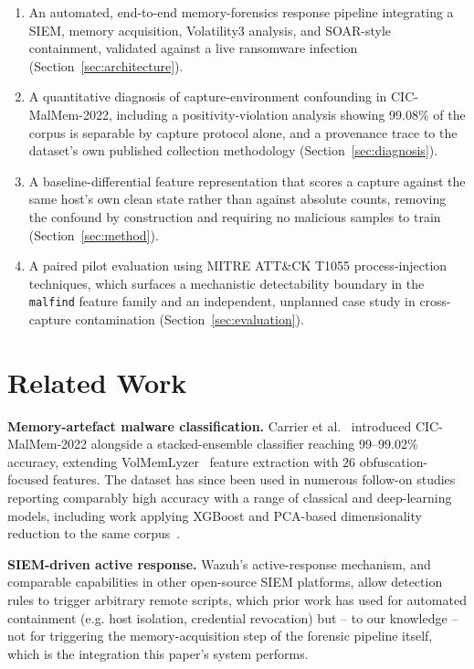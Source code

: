 \documentclass[conference]{IEEEtran}
\begin{document}
\begin{enumerate}
\item An automated, end-to-end memory-forensics response pipeline integrating a
SIEM, memory acquisition, Volatility3 analysis, and SOAR-style containment,
validated against a live ransomware infection (Section~\ref{sec:architecture}).
\item A quantitative diagnosis of capture-environment confounding in
CIC-MalMem-2022, including a positivity-violation analysis showing 99.08\% of
the corpus is separable by capture protocol alone, and a provenance trace to the
dataset's own published collection methodology (Section~\ref{sec:diagnosis}).
\item A baseline-differential feature representation that scores a capture
against the same host's own clean state rather than against absolute counts,
removing the confound by construction and requiring no malicious samples to
train (Section~\ref{sec:method}).
\item A paired pilot evaluation using MITRE ATT\&CK T1055 process-injection
techniques, which surfaces a mechanistic detectability boundary in the
\texttt{malfind} feature family and an independent, unplanned case study in
cross-capture contamination (Section~\ref{sec:evaluation}).
\end{enumerate}

\section{Related Work}

\textbf{Memory-artefact malware classification.} Carrier et al.~\cite{carrier2022}
introduced CIC-MalMem-2022 alongside a stacked-ensemble classifier reaching
99--99.02\% accuracy, extending VolMemLyzer~\cite{lashkari2019} feature
extraction with 26 obfuscation-focused features. The dataset has since been used
in numerous follow-on studies reporting comparably high accuracy with a range of
classical and deep-learning models, including work applying XGBoost and PCA-based
dimensionality reduction to the same corpus~\cite{abid2024}.

\textbf{SIEM-driven active response.} Wazuh's active-response mechanism, and
comparable capabilities in other open-source SIEM platforms, allow
detection rules to trigger arbitrary remote scripts, which prior work has used
for automated containment (e.g. host isolation, credential revocation) but --
to our knowledge -- not for triggering the memory-acquisition step of the
forensic pipeline itself, which is the integration this paper's system
performs.
\end{document}
